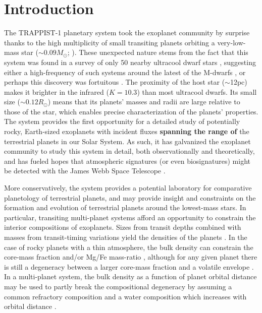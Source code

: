 \documentclass[twocolumn]{aastex63}
\begin{document}



\section{Introduction}

The TRAPPIST-1 planetary system took the exoplanet community by surprise
thanks to the high multiplicity of small transiting planets orbiting a very-low-mass star ($\sim0.09 M_\odot$; \citealt{Gillon2016, Gillon2017, Luger2017a, vanGrootel2018}).
These unexpected nature stems from the fact that this system was found in a survey
of only 50 nearby ultracool dwarf stars \citep{Jehin2011, Gillon2013}, suggesting either a high-frequency of such systems around the latest of the M-dwarfs \citep{He2016}, or perhaps this discovery was fortuitous \citep{Sestovic2020, Sagear2020}.
The proximity of the host star ($\sim$12pc) makes
it brighter in the infrared ($K=10.3$) than most ultracool dwarfs.
Its small size ($\sim 0.12 R_\odot$)
means that its planets' masses and radii are large relative to those of
the star, which enables precise characterization of the planets' properties.
The system provides the first opportunity for a detailed study of potentially
rocky, Earth-sized exoplanets with incident fluxes \textbf{spanning the
range of} the terrestrial
planets in our Solar System.  As such, it has galvanized the exoplanet
community to study this system in detail, both observationally and theoretically,
and has fueled hopes that atmospheric signatures (or even biosignatures) might
be detected with the James Webb Space Telescope \citep{Barstow2016, Morley2017,
    Batalha2018, Krissansen2018, Wunderlich2019, Fauchez2019a, Lustig-Yaeger2019}.

More conservatively, the system provides a potential laboratory
for comparative planetology of terrestrial planets, and may provide insight
and constraints on the formation and evolution of terrestrial planets around
the lowest-mass stars. In particular, transiting multi-planet systems afford
an opportunity to constrain the interior compositions of exoplanets.  Sizes
from transit depths combined  with masses from transit-timing variations yield
the densities of the planets \citep[e.g.][]{Agol2017}. In the case of rocky
planets with a thin atmosphere, the bulk density can constrain the core-mass
fraction and/or Mg/Fe mass-ratio \citep{Valencia2007}, although for any given
planet there is still a degeneracy between a larger core-mass fraction and a
volatile envelope \citep{Dorn2018}.  In a multi-planet system, the bulk density
as a function of planet orbital distance may be used to partly break the compositional
degeneracy by assuming a common refractory composition and a water composition
which increases with orbital distance \citep{Unterborn2018a,Lichtenberg2019}.
\end{document}
